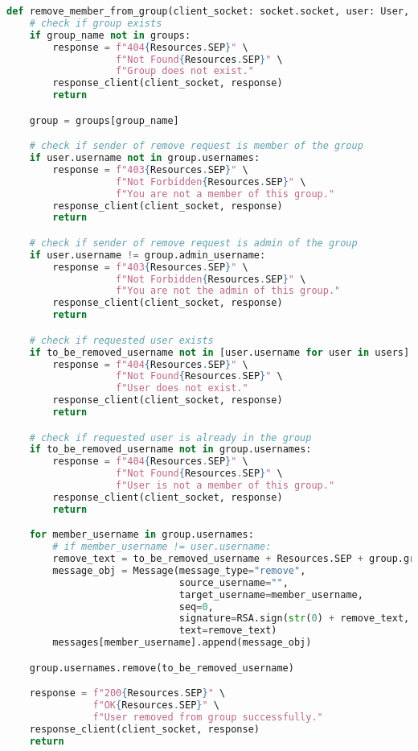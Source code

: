 \begin{latin}
\begin{lstlisting}[firstnumber=322, language=Python]
def remove_member_from_group(client_socket: socket.socket, user: User, group_name, to_be_removed_username):
    # check if group exists
    if group_name not in groups:
        response = f"404{Resources.SEP}" \
                   f"Not Found{Resources.SEP}" \
                   f"Group does not exist."
        response_client(client_socket, response)
        return

    group = groups[group_name]

    # check if sender of remove request is member of the group
    if user.username not in group.usernames:
        response = f"403{Resources.SEP}" \
                   f"Not Forbidden{Resources.SEP}" \
                   f"You are not a member of this group."
        response_client(client_socket, response)
        return

    # check if sender of remove request is admin of the group
    if user.username != group.admin_username:
        response = f"403{Resources.SEP}" \
                   f"Not Forbidden{Resources.SEP}" \
                   f"You are not the admin of this group."
        response_client(client_socket, response)
        return

    # check if requested user exists
    if to_be_removed_username not in [user.username for user in users]:
        response = f"404{Resources.SEP}" \
                   f"Not Found{Resources.SEP}" \
                   f"User does not exist."
        response_client(client_socket, response)
        return

    # check if requested user is already in the group
    if to_be_removed_username not in group.usernames:
        response = f"404{Resources.SEP}" \
                   f"Not Found{Resources.SEP}" \
                   f"User is not a member of this group."
        response_client(client_socket, response)
        return

    for member_username in group.usernames:
        # if member_username != user.username:
        remove_text = to_be_removed_username + Resources.SEP + group.group_name
        message_obj = Message(message_type="remove",
                              source_username="",
                              target_username=member_username,
                              seq=0,
                              signature=RSA.sign(str(0) + remove_text, server_private_key),
                              text=remove_text)
        messages[member_username].append(message_obj)

    group.usernames.remove(to_be_removed_username)

    response = f"200{Resources.SEP}" \
               f"OK{Resources.SEP}" \
               f"User removed from group successfully."
    response_client(client_socket, response)
    return
\end{lstlisting}
\end{latin}
